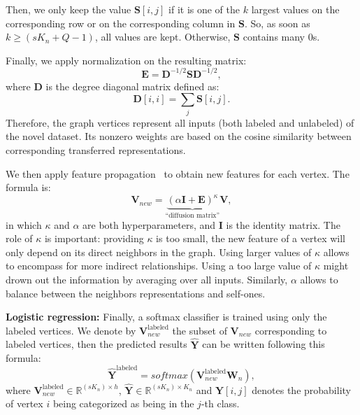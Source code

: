 \documentclass[a4paper,conference]{IEEEtran}
\begin{document}
Then, we only keep the value $\mathbf{S}[i,j]$ if it is one of the $k$ largest values on the corresponding row or on the corresponding column in $\mathbf{S}$. So, as soon as $k\geq (s K_n + Q - 1)$, all values are kept. Otherwise, $\mathbf{S}$ contains many 0s.

Finally, we apply normalization on the resulting matrix: 
\begin{equation}
\mathbf{E} = \mathbf{D}^{-1/2}\mathbf{S}\mathbf{D}^{-1/2},
\end{equation}
where $\mathbf{D}$ is the degree diagonal matrix defined as: $$\mathbf{D}[i,i] = \sum_j{\mathbf{S}[i,j]}.$$
Therefore, the graph vertices represent all inputs (both labeled and unlabeled) of the novel dataset. Its nonzero weights are based on the cosine similarity between corresponding transferred representations.

We then apply feature propagation~\cite{wu2019simplifying} to obtain new features for each vertex. The formula is:
\begin{equation}
\mathbf{V}_{new}=\underbrace{(\alpha \mathbf{I} + \mathbf{E})^\kappa}_{\text{``diffusion matrix''}}\mathbf{V},
\label{eq:featurepro}
\end{equation}
in which $\kappa$ and $\alpha$ are both hyperparameters, and $\mathbf{I}$ is the identity matrix. The role of $\kappa$ is important: providing $\kappa$ is too small, the new feature of a vertex will only depend on its direct neighbors in the graph. Using larger values of $\kappa$ allows to encompass for more indirect relationships. Using a too large value of $\kappa$ might drown out the information by averaging over all inputs. Similarly, $\alpha$ allows to balance between the neighbors representations and self-ones.

\textbf{Logistic regression:} Finally, a softmax classifier is trained using only the labeled vertices. We denote by $\mathbf{V}_{new}^{\text{labeled}}$ the subset of $\mathbf{V}_{new}$ corresponding to labeled vertices, then the predicted results $\hat{\mathbf{Y}}$ can be written following this formula:
\begin{equation}
\hat{\mathbf{Y}}^{\text{labeled}}=softmax(\mathbf{V}_{new}^{\text{labeled}}\mathbf{W}_n),
\label{eq:yhat}
\end{equation}
where $\mathbf{V}_{new}^{\text{labeled}}\in\mathbb{R}^{(s K_n)\times h}$, $\hat{\mathbf{Y}}\in\mathbb{R}^{(s K_n)\times K_n}$ and $\hat{\mathbf{Y}}[i,j]$ denotes the probability of vertex $i$ being categorized as being in the $j$-th class. 
\end{document}
